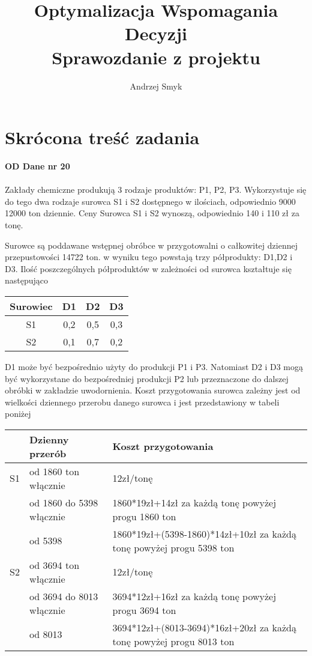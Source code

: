 \documentclass[a4paper,10pt,fleqn]{article}
\title{Optymalizacja Wspomagania Decyzji\\Sprawozdanie z projektu}
\author{Andrzej Smyk}
\begin{document}
\maketitle
	\section{Skrócona treść zadania}
		{\bf OD \hfill Dane nr 20\\\hfill}
		\\\hfill
		Zakłady chemiczne produkują 3 rodzaje produktów: P1, P2, P3. Wykorzystuje się do tego dwa rodzaje surowca S1 i S2 dostępnego w ilościach,
		odpowiednio 9000 12000 ton dziennie. Ceny Surowca S1 i S2 wynoszą, odpowiednio 140 i 110 zł za tonę.

		Surowce są poddawane wstępnej obróbce w przygotowalni o całkowitej dziennej przepustowości 14722 ton. 
		w wyniku tego powstają trzy półprodukty: D1,D2 i D3. Ilość poszczególnych półproduktów w zależności 
		od surowca kształtuje się następująco 

		\begin{center}
		    \begin{tabular}{ | c | c | c | c |}
		    \hline
		    Surowiec & D1 & D2 & D3 \\ \hline
			S1 & 0,2 & 0,5 & 0,3 \\ \hline
			S2 & 0,1 & 0,7 & 0,2 \\ \hline
		    \end{tabular}
		\end{center}

		D1 może być bezpośrednio użyty do produkcji P1 i P3. Natomiast D2 i D3 mogą być wykorzystane
		do bezpośredniej produkcji P2 lub przeznaczone do dalszej obróbki w zakładzie uwodornienia. Koszt przygotowania surowca zależny jest od wielkości 
		dziennego przerobu danego surowca i jest przedstawiony w tabeli poniżej

		\begin{center}
		    \begin{tabular}{ | l | l | l |}
		    \hline
		    & Dzienny przerób & Koszt przygotowania \\ \hline
			S1 & od 1860 ton włącznie & 12zł/tonę \\ \hline
			& od 1860 do 5398 włącznie & 1860*19zł+14zł za każdą tonę powyżej progu 1860 ton \\ \hline
			& od 5398 & 1860*19zł+(5398-1860)*14zł+10zł za każdą tonę powyżej progu 5398 ton \\ \hline
			S2 & od 3694 ton włącznie & 12zł/tonę \\ \hline
			& od 3694 do 8013 włącznie & 3694*12zł+16zł za każdą tonę powyżej progu 3694 ton \\ \hline
			& od 8013 & 3694*12zł+(8013-3694)*16zł+20zł za każdą tonę powyżej progu 8013 ton \\ \hline
		    \end{tabular}
		\end{center}
\end{document}
